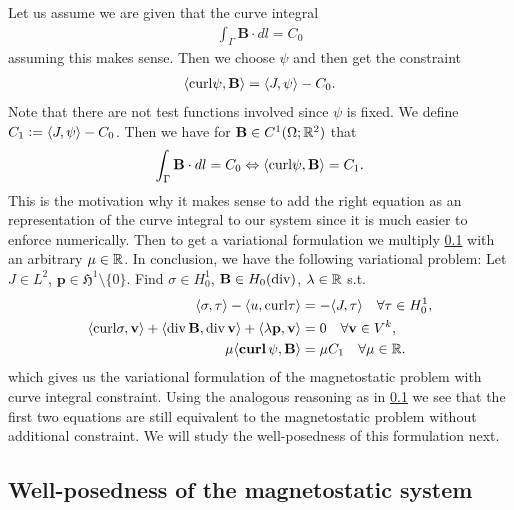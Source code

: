 \documentclass[../master_thesis.tex]{subfiles}
\begin{document}
Let us assume we are given that the curve integral 
\begin{align*}
    \int_\Gamma \mathbf{B} \cdot dl = C_0
\end{align*}
assuming this makes sense. Then we choose $\psi$ and then get 
the constraint
\begin{align*}
    \langle \mathbf{\operatorname{curl}} \psi, \mathbf{B} \rangle = \langle J, \psi \rangle - C_0.
\end{align*}
Note that there are not test functions involved since $\psi$ is fixed. 
We define $C_1 \vcentcolon=  \langle J, \psi \rangle - C_0$. 
Then we have for $\mathbf{B} \in C^1(\Omega;\mathbb{R}^2)$ that 
\begin{align*}
    \int_\Gamma \mathbf{B} \cdot dl = C_0 
    \Leftrightarrow \langle \mathbf{\operatorname{curl}} \psi, \mathbf{B} \rangle = C_1.
\end{align*}
This is the motivation why it makes sense to add the right equation as an 
representation of the curve integral to our system since it is much easier 
to enforce numerically.
Then to get a variational 
formulation we multiply \ref{} with an arbitrary $\mu \in \mathbb{R}$. 
In conclusion, we have the following variational problem:
Let $J \in L^2$, $\mathbf{p} \in \mathfrak{H}^1 \setminus \{0\}$. 
Find $\sigma \in H^1_0$, $\mathbf{B} \in H_0(\operatorname{div})$, $\lambda \in \mathbb{R}$ s.t.
\begin{align}
    \langle \sigma, \tau \rangle - \langle u, \mathbf{\curl}\tau \rangle 
    &=  -\langle J, \tau \rangle \quad \forall \tau \in H^1_0, \label{eq:first_eq_mixed_formulation_curve_integral}
    \\ \langle \mathbf{\curl}\sigma, \mathbf{v} \rangle + \langle \diver \mathbf{B}, \diver \mathbf{v} \rangle 
    + \langle \lambda \mathbf{p}, \mathbf{v} \rangle 
    &= 0 \quad \forall \mathbf{v} \in V^k, \label{eq:second_eq_mixed_formulation_curve_integral}
    \\ \mu \langle \bm{\curl} \psi, \mathbf{B} \rangle &= \mu C_1 \quad \forall \mu \in \real.
\end{align}
which gives us the variational formulation of the magnetostatic problem with curve integral 
constraint. Using the analogous reasoning as in \ref{} we see that the first two equations are still equivalent 
to the magnetostatic problem without additional constraint.
We will study the well-posedness of this formulation next. 

\subsection{Well-posedness of the magnetostatic system}
\end{document}

